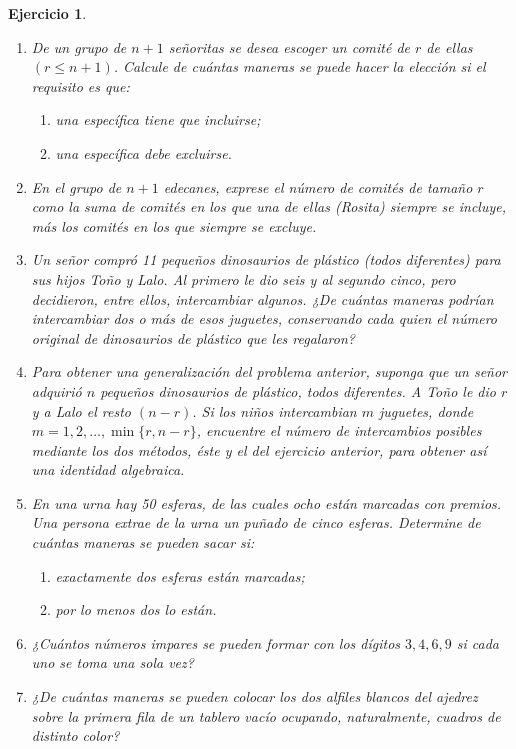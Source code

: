\documentclass[12pt,twoside]{article}
\newtheorem{Ejer}{Ejercicio}
\begin{document}
\begin{Ejer}
\begin{enumerate}
\item De un grupo de $n+1$ señoritas se desea escoger un comité de $r$ de ellas $(r\leq n+1)$. Calcule de cuántas maneras se puede hacer la elección si el requisito es que:
\begin{enumerate}
\item una específica tiene que incluirse;
\item una específica debe excluirse.
\end{enumerate}

\item En el grupo de $n+1$ edecanes, exprese el número de comités de tamaño $r$ como la suma de comités en los que una de ellas (Rosita) siempre se incluye, más los comités en los que siempre se excluye.

\item Un señor compró 11 pequeños dinosaurios de plástico (todos diferentes) para sus hijos Toño y Lalo. Al primero le dio seis y al segundo cinco, pero decidieron, entre ellos, intercambiar algunos. ¿De cuántas maneras podrían intercambiar dos o más de esos juguetes, conservando cada quien el número original de dinosaurios de plástico que les regalaron?

\item Para obtener una generalización del problema anterior, suponga que un señor adquirió $n$ pequeños dinosaurios de plástico, todos diferentes. A Toño le dio $r$ y a Lalo el resto $(n-r)$. Si los niños intercambian $m$ juguetes, donde $m=1,2,\ldots,\min\{r,n-r\}$, encuentre el número de intercambios posibles mediante los dos métodos, éste y el del ejercicio anterior, para obtener así una identidad algebraica.

\item En una urna hay 50 esferas, de las cuales ocho están marcadas con premios. Una persona extrae de la urna un puñado de cinco esferas. Determine de cuántas maneras se pueden sacar si:
\begin{enumerate}
\item exactamente dos esferas están marcadas;
\item por lo menos dos lo están.
\end{enumerate}

\item ¿Cuántos números impares se pueden formar con los dígitos $3,4,6,9$ si cada uno se toma una sola vez?

\item ¿De cuántas maneras se pueden colocar los dos alfiles blancos del ajedrez sobre la primera fila de un tablero vacío ocupando, naturalmente, cuadros de distinto color?


\end{enumerate}
\end{Ejer}
\end{document}
